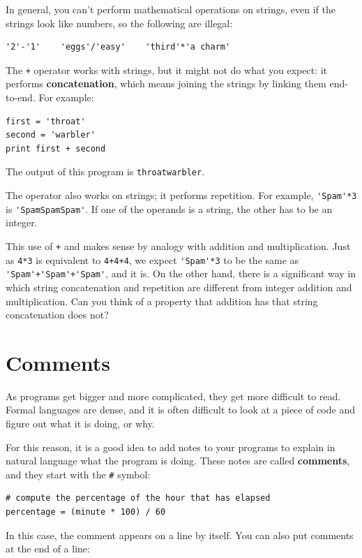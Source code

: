 \documentclass[10pt]{book}
\begin{document}
In general, you can't perform mathematical operations on strings, even
if the strings look like numbers, so the following are illegal:

\begin{verbatim}
'2'-'1'    'eggs'/'easy'    'third'*'a charm'
\end{verbatim}
%
The {\tt +} operator works with strings, but it
might not do what you expect: it performs
{\bf concatenation}, which means joining the strings by
linking them end-to-end.  For example:

\begin{verbatim}
first = 'throat'
second = 'warbler'
print first + second
\end{verbatim}
%
The output of this program is {\tt throatwarbler}.

The {\tt *} operator also works on strings; it performs repetition.
For example, \verb"'Spam'*3" is \verb"'SpamSpamSpam'".  If one of the operands
is a string, the other has to be an integer.

This use of {\tt +} and {\tt *} makes sense by
analogy with addition and multiplication.  Just as {\tt 4*3} is
equivalent to {\tt 4+4+4}, we expect \verb"'Spam'*3" to be the same as
\verb"'Spam'+'Spam'+'Spam'", and it is.  On the other hand, there is a
significant way in which string concatenation and repetition are
different from integer addition and multiplication.
Can you think of a property that addition has
that string concatenation does not?


\section{Comments}

As programs get bigger and more complicated, they get more difficult
to read.  Formal languages are dense, and it is often difficult to
look at a piece of code and figure out what it is doing, or why.

For this reason, it is a good idea to add notes to your programs to explain
in natural language what the program is doing.  These notes are called
{\bf comments}, and they start with the \verb"#" symbol:

\begin{verbatim}
# compute the percentage of the hour that has elapsed
percentage = (minute * 100) / 60
\end{verbatim}
%
In this case, the comment appears on a line by itself.  You can also put
comments at the end of a line:
\end{document}
